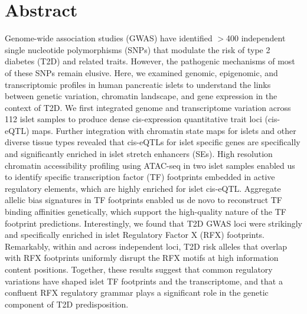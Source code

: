 \section{Abstract}
Genome-wide association studies (GWAS) have identified $>$400 independent single nucleotide polymorphisms (SNPs) that modulate the risk of type 2 diabetes (T2D) and related traits. However, the pathogenic mechanisms of most of these SNPs remain elusive. Here, we examined genomic, epigenomic, and transcriptomic profiles in human pancreatic islets to understand the links between genetic variation, chromatin landscape, and gene expression in the context of T2D. We first integrated genome and transcriptome variation across 112 islet samples to produce dense cis-expression quantitative trait loci (cis-eQTL) maps. Further integration with chromatin state maps for islets and other diverse tissue types revealed that cis-eQTLs for islet specific genes are specifically and significantly enriched in islet stretch enhancers (SEs). High resolution chromatin accessibility profiling using ATAC-seq in two islet samples enabled us to identify specific transcription factor (TF) footprints embedded in active regulatory elements, which are highly enriched for islet cis-eQTL. Aggregate allelic bias signatures in TF footprints enabled us de novo to reconstruct TF binding affinities genetically, which support the high-quality nature of the TF footprint predictions. Interestingly, we found that T2D GWAS loci were strikingly and specifically enriched in islet Regulatory Factor X (RFX) footprints. Remarkably, within and across independent loci, T2D risk alleles that overlap with RFX footprints uniformly disrupt the RFX motifs at high information content positions. Together, these results suggest that common regulatory variations have shaped islet TF footprints and the transcriptome, and that a confluent RFX regulatory grammar plays a significant role in the genetic component of T2D predisposition.

